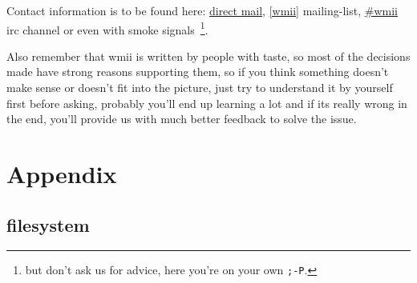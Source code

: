 \documentclass[12pt,a4paper]{article} %
\begin{document}
  Contact information is to be found here:
  \href{http://wmii.de/index.php/BeginnersGuide}{direct mail},
  \href{http://wmii.de/index.php/MailingList}{[wmii]} mailing-list,
  \href{http://wmii.de/index.php/IRC}{\#wmii} irc channel or even
  with smoke signals~\footnote{ but don't ask us for advice, here
  you're on your own \texttt{;-P}.}.

  Also remember that wmii is written by people with taste, so most
  of the decisions made have strong reasons supporting them, so if
  you think something doesn't make sense or doesn't fit into the
  picture, just try to understand it by yourself first before
  asking, probably you'll end up learning a lot and if its really
  wrong in the end, you'll provide us with much better feedback to
  solve the issue.

\newpage

\section{Appendix}
\label{sec:appendix}

\subsection{filesystem}
\end{document}
